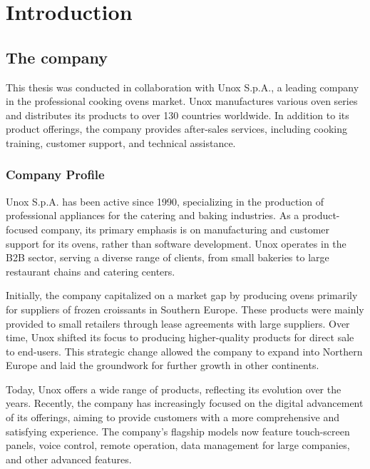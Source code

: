 
\chapter{Introduction}
\label{chp:intro}

\section{The company}

This thesis was conducted in collaboration with Unox S.p.A., a leading company in the professional cooking ovens market. Unox manufactures various oven series and distributes its products to over 130 countries worldwide. In addition to its product offerings, the company provides after-sales services, including cooking training, customer support, and technical assistance.

\subsection{Company Profile}

Unox S.p.A. has been active since 1990, specializing in the production of professional appliances for the catering and baking industries. As a product-focused company, its primary emphasis is on manufacturing and customer support for its ovens, rather than software development. Unox operates in the \ac{B2B} sector, serving a diverse range of clients, from small bakeries to large restaurant chains and catering centers.

Initially, the company capitalized on a market gap by producing ovens primarily for suppliers of frozen croissants in Southern Europe. These products were mainly provided to small retailers through lease agreements with large suppliers. Over time, Unox shifted its focus to producing higher-quality products for direct sale to end-users. This strategic change allowed the company to expand into Northern Europe and laid the groundwork for further growth in other continents.

Today, Unox offers a wide range of products, reflecting its evolution over the years. Recently, the company has increasingly focused on the digital advancement of its offerings, aiming to provide customers with a more comprehensive and satisfying experience. The company’s flagship models now feature touch-screen panels, voice control, remote operation, data management for large companies, and other advanced features.

